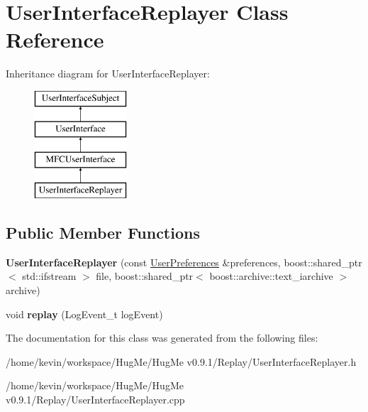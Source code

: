 \hypertarget{classUserInterfaceReplayer}{
\section{UserInterfaceReplayer Class Reference}
\label{classUserInterfaceReplayer}
}
Inheritance diagram for UserInterfaceReplayer:\begin{figure}[H]
\begin{center}
\leavevmode
\includegraphics[height=4.000000cm]{classUserInterfaceReplayer}
\end{center}
\end{figure}
\subsection*{Public Member Functions}
\begin{DoxyCompactItemize}
\item 
\hypertarget{classUserInterfaceReplayer_a93c940785e83aaa7860159b39470c49c}{
{\bfseries UserInterfaceReplayer} (const \hyperlink{structUserPreferences}{UserPreferences} \&preferences, boost::shared\_\-ptr$<$ std::ifstream $>$ file, boost::shared\_\-ptr$<$ boost::archive::text\_\-iarchive $>$ archive)}
\label{classUserInterfaceReplayer_a93c940785e83aaa7860159b39470c49c}

\item 
\hypertarget{classUserInterfaceReplayer_a1950dc954873eb5ca01f25a054b63395}{
void {\bfseries replay} (LogEvent\_\-t logEvent)}
\label{classUserInterfaceReplayer_a1950dc954873eb5ca01f25a054b63395}

\end{DoxyCompactItemize}


The documentation for this class was generated from the following files:\begin{DoxyCompactItemize}
\item 
/home/kevin/workspace/HugMe/HugMe v0.9.1/Replay/UserInterfaceReplayer.h\item 
/home/kevin/workspace/HugMe/HugMe v0.9.1/Replay/UserInterfaceReplayer.cpp\end{DoxyCompactItemize}

